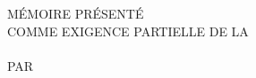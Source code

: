 \documentclass[main.tex]{subfiles}
\begin{document}
\begin{titlepage}

    \begin{center}
        {
            \MakeUppercase{\University}
            \\[4cm plus 5mm]
            {\MakeUppercase{\Titre}}
            \\[4cm plus 5mm]
            MÉMOIRE PRÉSENTÉ \\
            COMME EXIGENCE PARTIELLE DE LA \\
            \MakeUppercase{\Programme}
            \\[4cm plus 5mm]
            PAR \\
            \MakeUppercase{\Nom}
            \vfill
            \MakeUppercase{\Date}
        }
    \end{center}

\end{titlepage}
\end{document}
